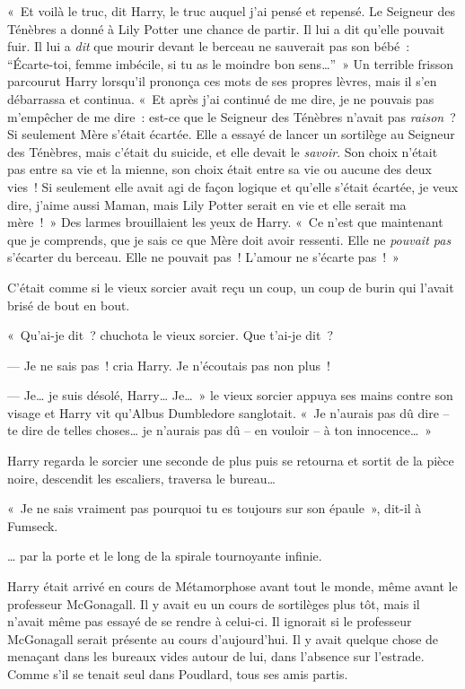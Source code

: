 «~Et voilà le truc, dit Harry, le truc auquel j'ai pensé et repensé.
Le Seigneur des Ténèbres a donné à Lily Potter une chance de partir.
Il lui a dit qu'elle pouvait fuir.
Il lui a \emph{dit} que mourir devant le berceau ne sauverait pas son bébé~: “Écarte-toi, femme imbécile, si tu as le moindre bon sens…”~» Un terrible frisson parcourut Harry lorsqu'il prononça ces mots de ses propres lèvres, mais il s'en débarrassa et continua.
«~Et après j'ai continué de me dire, je ne pouvais pas m'empêcher de me dire~: est-ce que le Seigneur des Ténèbres n'avait pas \emph{raison}~?
Si seulement Mère s'était écartée.
Elle a essayé de lancer un sortilège au Seigneur des Ténèbres, mais c'était du suicide, et elle devait le \emph{savoir}.
Son choix n'était pas entre sa vie et la mienne, son choix était entre sa vie ou aucune des deux vies~!
Si seulement elle avait agi de façon logique et qu'elle s'était écartée, je veux dire, j'aime aussi Maman, mais Lily Potter serait en vie et elle serait ma mère~!~»
Des larmes brouillaient les yeux de Harry.
«~Ce n'est que maintenant que je comprends, que je sais ce que Mère doit avoir ressenti.
Elle ne \emph{pouvait pas} s'écarter du berceau.
Elle ne pouvait pas~!
L'amour ne s'écarte pas~!~»

C'était comme si le vieux sorcier avait reçu un coup, un coup de burin qui l'avait brisé de bout en bout.

«~Qu'ai-je dit~? chuchota le vieux sorcier.
Que t'ai-je dit~?

--- Je ne sais pas~! cria Harry.
Je n'écoutais pas non plus~!

--- Je… je suis désolé, Harry…
Je…~» le vieux sorcier appuya ses mains contre son visage et Harry vit qu'Albus Dumbledore sanglotait.
«~Je n'aurais pas dû dire -- te dire de telles choses… je n'aurais pas dû -- en vouloir -- à ton innocence…~»

Harry regarda le sorcier une seconde de plus puis se retourna et sortit de la pièce noire, descendit les escaliers, traversa le bureau…

«~Je ne sais vraiment pas pourquoi tu es toujours sur son épaule~», dit-il à Fumseck.

… par la porte et le long de la spirale tournoyante infinie.

\later

Harry était arrivé en cours de Métamorphose avant tout le monde, même avant le professeur McGonagall.
Il y avait eu un cours de sortilèges plus tôt, mais il n'avait même pas essayé de se rendre à celui-ci.
Il ignorait si le professeur McGonagall serait présente au cours d'aujourd'hui.
Il y avait quelque chose de menaçant dans les bureaux vides autour de lui, dans l'absence sur l'estrade.
Comme s'il se tenait seul dans Poudlard, tous ses amis partis.

